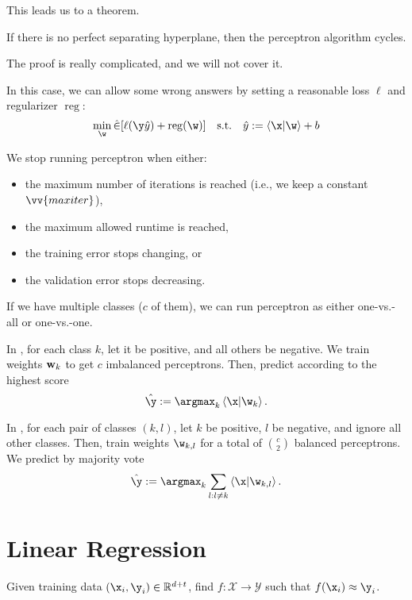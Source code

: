 \documentclass[class=cs480,notes,tikz]{agony}
\begin{document}
This leads us to a theorem.

\begin{theorem}
  If there is no perfect separating hyperplane, then the perceptron algorithm cycles.
\end{theorem}

The proof is really complicated, and we will not cover it.

In this case, we can allow some wrong answers by setting a reasonable
loss $\ell$ and regularizer $\operatorname{reg}$:
\[ \min_{\w} \hat{\E}[\ell(\y\hat y) + \operatorname{reg}(\w)] \qq{s.t.} \hat y := \ip{\x}{\w} + b \]

We stop running perceptron when either:
\begin{itemize}[nosep]
  \item the maximum number of iterations is reached (i.e., we keep a constant $\vv{maxiter}$),
  \item the maximum allowed runtime is reached,
  \item the training error stops changing, or
  \item the validation error stops decreasing.
\end{itemize}

If we have multiple classes ($c$ of them),
we can run perceptron as either one-vs.-all or one-vs.-one.

In , for each class $k$,
let it be positive, and all others be negative.
We train weights $\vb w_k$ to get $c$ imbalanced perceptrons.
Then, predict according to the highest score
\[ \hat\y := \argmax_k \ip{\x}{\w_k}. \]

In , for each pair of classes $(k,l)$,
let $k$ be positive, $l$ be negative, and ignore all other classes.
Then, train weights $\w_{k,l}$ for a total of $\binom{c}{2}$ balanced perceptrons.
We predict by majority vote
\[ \hat\y := \argmax_k \sum_{l:l\neq k} \ip{\x}{\w_{k,l}}. \]

\section{Linear Regression}


\begin{problem}[regression]
  Given training data $(\x_i,\y_i) \in \R^{d+t}$, find $f : \mathcal X \to \mathcal Y$
  such that $f(\x_i) \approx \y_i$.
\end{problem}
\end{document}
